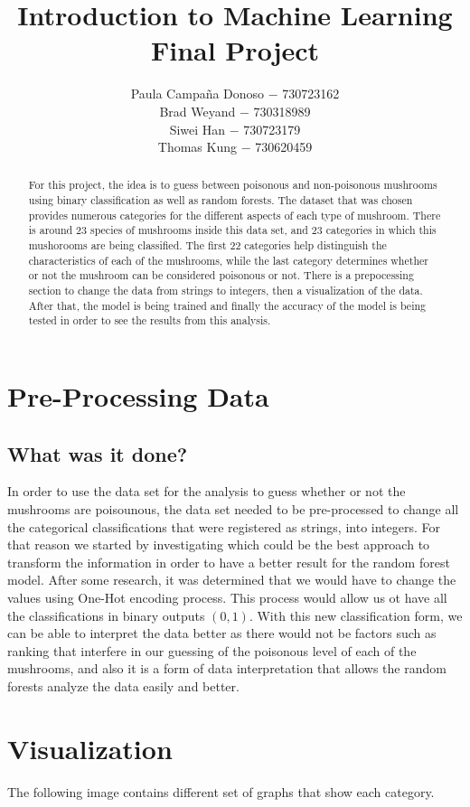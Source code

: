 \documentclass[]{article}
\title{Introduction to Machine Learning Final Project}
\author{Paula Campaña Donoso $-$ 730723162 \\ Brad Weyand $-$ 730318989 \\ Siwei Han $-$ 730723179 \\ Thomas Kung $-$ 730620459}
\begin{document}
\maketitle

\begin{abstract}
For this project, the idea is to guess between poisonous and non-poisonous mushrooms using binary classification as well as random forests. The dataset that was chosen provides numerous categories for the different aspects of each type of mushroom. There is around 23 species of mushrooms inside this data set, and 23 categories in which this mushorooms are being classified. The first 22 categories help distinguish the characteristics of each of the mushrooms, while the last category determines whether or not the mushroom can be considered poisonous or not. There is a prepocessing section to change the data from strings to integers, then a visualization of the data. After that, the model is being trained and finally the accuracy of the model is being tested in order to see the results from this analysis.
\end{abstract}

\section{Pre-Processing Data}

\subsection{What was it done?}
In order to use the data set for the analysis to guess whether or not the mushrooms are poisounous, the data set needed to be pre-processed to change all the categorical classifications that were registered as strings, into integers. For that reason we started by investigating which could be the best approach to transform the information in order to have a better result for the random forest model. After some research, it was determined that we would have to change the values using One-Hot encoding process. This process would allow us ot have all the classifications in binary outputs $(0,1)$. With this new classification form, we can be able to interpret the data better as there would not be factors such as ranking that interfere in our guessing of the poisonous level of each of the mushrooms, and also it is a form of data interpretation that allows the random forests analyze the data easily and better.

\section{Visualization}
The following image contains different set of graphs that show each category.
\end{document}
